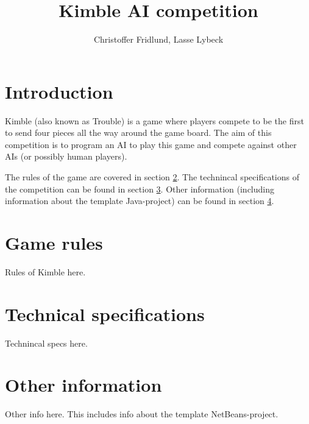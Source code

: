 \documentclass[10pt,a4paper]{article}
\author{Christoffer Fridlund, Lasse Lybeck}
\title{Kimble AI competition}
\begin{document}
\maketitle


\section{Introduction}

Kimble (also known as Trouble) is a game where players compete to be the first to send four pieces all the way around the game board. The aim of this competition is to program an AI to play this game and compete against other AIs (or possibly human players).

The rules of the game are covered in section \ref{sec:rules}. The technincal specifications of the competition can be found in section \ref{sec:tech-specs}. Other information (including information about the template Java-project) can be found in section \ref{sec:other-info}.


\section{Game rules}
\label{sec:rules}

Rules of Kimble here.



\section{Technical specifications}
\label{sec:tech-specs}

Technincal specs here.



\section{Other information}
\label{sec:other-info}

Other info here. This includes info about the template NetBeans-project.
\end{document}
